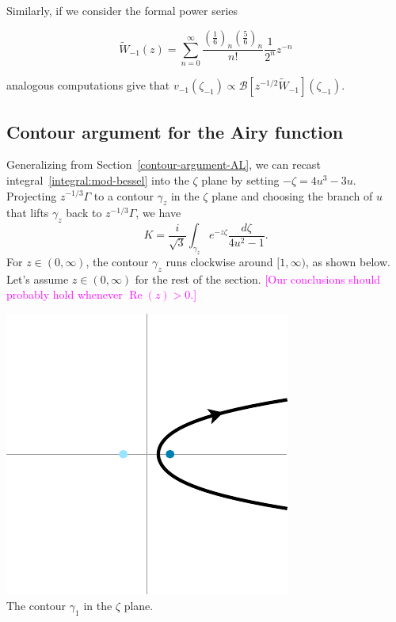 \documentclass{article}
\theoremstyle{definition}
\newcommand{\borel}{\mathcal{B}}
\begin{document}
Similarly, if we consider the formal power series

\begin{equation}
\tilde{W}_{-1}(z)=\sum_{n=0}^{\infty}\frac{\left(\frac{1}{6}\right)_n\left(\frac{5}{6}\right)_n}{n!}\frac{1}{2^n}z^{-n}
\end{equation}

analogous computations give that $v_{-1}(\zeta_{-1})\propto\borel\left[z^{-1/2}\tilde{W}_{-1}\right](\zeta_{-1})$.

\subsection{Contour argument for the Airy function}\label{contour-argument}
Generalizing from Section~\ref{contour-argument-AL}, we can recast integral~\eqref{integral:mod-bessel} into the $\zeta$ plane by setting $-\zeta = 4u^3 - 3u$. Projecting $z^{-1/3} \Gamma$ to a contour $\gamma_z$ in the $\zeta$ plane and choosing the branch of $u$ that lifts $\gamma_z$ back to $z^{-1/3} \Gamma$, we have
\begin{equation}\label{integral:mod-bessel-zeta}
K = \frac{i}{\sqrt{3}} \int_{\gamma_z} e^{-z\zeta}\frac{d\zeta}{4u^2 - 1}.
\end{equation}
For $z \in (0, \infty)$, the contour $\gamma_z$ runs clockwise around $[1, \infty)$, as shown below. Let's assume $z \in (0, \infty)$ for the rest of the section. \textcolor{magenta}{[Our conclusions should probably hold whenever $\operatorname{Re}(z) > 0$.]}
\begin{center}
\includegraphics{figures/zeta_contour_3.pdf} \\[1em]
{\small The contour $\gamma_1$ in the $\zeta$ plane.}
\end{center}
\end{document}
